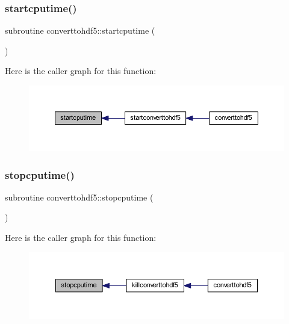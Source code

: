 \subsubsection{\texorpdfstring{startcputime()}{startcputime()}}
{\footnotesize\ttfamily subroutine converttohdf5\+::startcputime (\begin{DoxyParamCaption}{ }\end{DoxyParamCaption})}

Here is the caller graph for this function\+:\nopagebreak
\begin{figure}[H]
\begin{center}
\leavevmode
\includegraphics[width=350pt]{_convert_to_h_d_f5_8_f90_a76e597f0cbb118ca396467443f56d32c_icgraph}
\end{center}
\end{figure}
\mbox{\label{_convert_to_h_d_f5_8_f90_a672d8c511194ec59eff097fd233d3a4e}} 
\subsubsection{\texorpdfstring{stopcputime()}{stopcputime()}}
{\footnotesize\ttfamily subroutine converttohdf5\+::stopcputime (\begin{DoxyParamCaption}{ }\end{DoxyParamCaption})}

Here is the caller graph for this function\+:\nopagebreak
\begin{figure}[H]
\begin{center}
\leavevmode
\includegraphics[width=350pt]{_convert_to_h_d_f5_8_f90_a672d8c511194ec59eff097fd233d3a4e_icgraph}
\end{center}
\end{figure}
